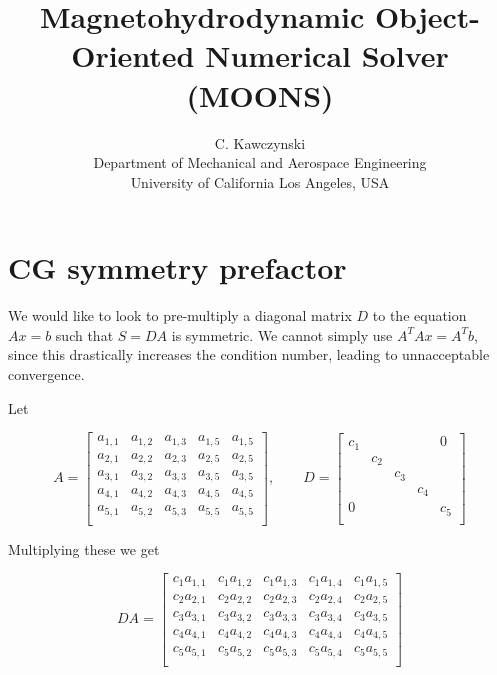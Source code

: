 \documentclass[landscape]{article}
\begin{document}
\doublespacing
\title{Magnetohydrodynamic Object-Oriented Numerical Solver (MOONS)}
\author{C. Kawczynski \\
Department of Mechanical and Aerospace Engineering \\
University of California Los Angeles, USA\\
}

\section{CG symmetry prefactor}

We would like to look to pre-multiply a diagonal matrix $D$ to the equation $Ax=b$ such that $S = DA$ is symmetric. We cannot simply use $A^T Ax = A^T b$, since this drastically increases the condition number, leading to unnacceptable convergence.

Let

\[
A = 
\left[
\begin{array}{ccccccccc}
a_{1,1} & a_{1,2} & a_{1,3} & a_{1,5} & a_{1,5} \\
a_{2,1} & a_{2,2} & a_{2,3} & a_{2,5} & a_{2,5} \\
a_{3,1} & a_{3,2} & a_{3,3} & a_{3,5} & a_{3,5} \\
a_{4,1} & a_{4,2} & a_{4,3} & a_{4,5} & a_{4,5} \\
a_{5,1} & a_{5,2} & a_{5,3} & a_{5,5} & a_{5,5} \\
\end{array}
\right]
, \qquad
D = 
\left[
\begin{array}{ccccccccc}
c_{1} &   &   &   &  0 \\
  & c_{2} &   &   &   \\
  &   & c_{3} &   &   \\
  &   &   & c_{4} &   \\
 0 &   &   &   & c_{5} \\
\end{array}
\right]
\]

Multiplying these we get

\[
DA = 
\left[
\begin{array}{ccccccccc}
c_1 a_{1,1} & c_1 a_{1,2} & c_1 a_{1,3} & c_1 a_{1,4} & c_1 a_{1,5} \\
c_2 a_{2,1} & c_2 a_{2,2} & c_2 a_{2,3} & c_2 a_{2,4} & c_2 a_{2,5} \\
c_3 a_{3,1} & c_3 a_{3,2} & c_3 a_{3,3} & c_3 a_{3,4} & c_3 a_{3,5} \\
c_4 a_{4,1} & c_4 a_{4,2} & c_4 a_{4,3} & c_4 a_{4,4} & c_4 a_{4,5} \\
c_5 a_{5,1} & c_5 a_{5,2} & c_5 a_{5,3} & c_5 a_{5,4} & c_5 a_{5,5} \\
\end{array}
\right]
\]
\end{document}
